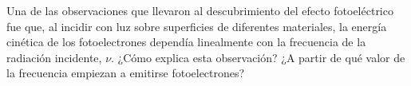 \documentclass[addpoints,spanish, 12pt,a4paper]{exam}
\author{David De Sancho}
\begin{document}
\vspace{0.1in} %


\begin{center}
    \gradetable[h][questions]
\end{center}
\vspace{0.1in} %


\begin{questions} %

    \question[2\half] Una de las observaciones que llevaron al descubrimiento
    del efecto fotoeléctrico fue que, al incidir con luz sobre superficies
    de diferentes materiales, la energía cinética de los fotoelectrones 
    dependía linealmente con la frecuencia de la radiación incidente, $\nu$.
    ¿Cómo explica esta observación? 
    ¿A partir de qué valor de la frecuencia empiezan a emitirse 
    fotoelectrones?

    \newpage
    
    

\end{questions}
\end{document}
